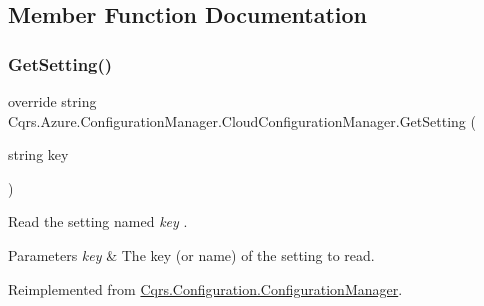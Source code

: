 \subsection{Member Function Documentation}
\mbox{\label{classCqrs_1_1Azure_1_1ConfigurationManager_1_1CloudConfigurationManager_a48228b7e2204a2449426de32cd6ecc65_a48228b7e2204a2449426de32cd6ecc65}} 
\subsubsection{\texorpdfstring{Get\+Setting()}{GetSetting()}}
{\footnotesize\ttfamily override string Cqrs.\+Azure.\+Configuration\+Manager.\+Cloud\+Configuration\+Manager.\+Get\+Setting (\begin{DoxyParamCaption}\item[{string}]{key }\end{DoxyParamCaption})\hspace{0.3cm}{\ttfamily [virtual]}}



Read the setting named {\itshape key} . 


\begin{DoxyParams}{Parameters}
{\em key} & The key (or name) of the setting to read.\\
\hline
\end{DoxyParams}


Reimplemented from \hyperlink{classCqrs_1_1Configuration_1_1ConfigurationManager_ac3e31af665b95b781fee23f577170a63_ac3e31af665b95b781fee23f577170a63}{Cqrs.\+Configuration.\+Configuration\+Manager}.

